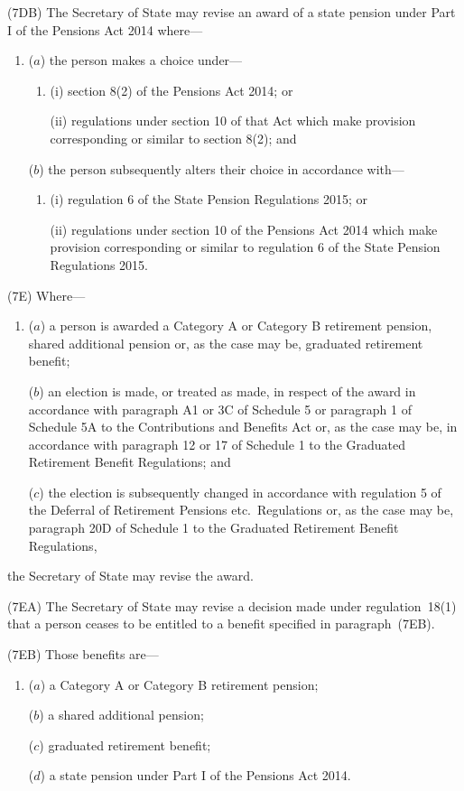 \documentclass[12pt,a4paper]{article}
\begin{document}
(7DB) The Secretary of State may revise an award of a state pension under Part I of the Pensions Act 2014 where—
\begin{enumerate}\item[]
($a$) the person makes a choice under—
\begin{enumerate}\item[]
(i) section 8(2) of the Pensions Act 2014; or

(ii) regulations under section 10 of that Act which make provision corresponding or similar to section 8(2); and
\end{enumerate}

($b$) the person subsequently alters their choice in accordance with—
\begin{enumerate}\item[]
(i) regulation 6 of the State Pension Regulations 2015; or

(ii) regulations under section 10 of the Pensions Act 2014 which make provision corresponding or similar to regulation 6 of the State Pension Regulations 2015.
\end{enumerate}
\end{enumerate}

(7E) Where—
\begin{enumerate}\item[]
($a$) a person is awarded a Category A or Category B retirement pension, shared additional pension or, as the case may be, graduated retirement benefit;

($b$) an election is made, or treated as made, in respect of the award in accordance with paragraph A1 or 3C of Schedule 5 or paragraph 1 of Schedule 5A to the Contributions and Benefits Act or, as the case may be, in accordance with paragraph 12 or 17 of Schedule 1 to the Graduated Retirement Benefit Regulations; and

($c$) the election is subsequently changed in accordance with regulation 5 of the Deferral of Retirement Pensions etc.\ Regulations or, as the case may be, paragraph 20D of Schedule 1 to the Graduated Retirement Benefit Regulations,
\end{enumerate}
the Secretary of State may revise the award.

(7EA) The Secretary of State may revise a decision made under regulation~18(1) that a person ceases to be entitled to a benefit specified in paragraph~(7EB).

(7EB) Those benefits are—
\begin{enumerate}\item[]
($a$) a Category A or Category B retirement pension;

($b$) a shared additional pension;

($c$) graduated retirement benefit;

($d$) a state pension under Part I of the Pensions Act 2014.
\end{enumerate}
\end{document}
